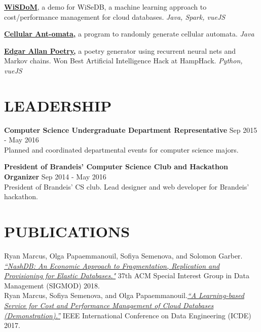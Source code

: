 \documentclass{res}
\begin{document}
\begin{resume}
\textbf{\href{https://www.youtube.com/watch?v=YAKRxSoUs18&feature=youtu.be}{WiSDoM}}, a demo for WiSeDB, a machine learning approach to cost/performance management for cloud  databases. {\sl Java, Spark, vueJS}
	
\textbf{\href{https://sofiya.io/blog/turmite-art}{Cellular Ant-omata,}} a program to randomly generate cellular automata. {\sl Java}
	
\textbf{\href{https://sofiya.io/projects/edgar-allan-poetry.html}{Edgar Allan Poetry,}} a poetry generator using recurrent neural nets and Markov chains. Won Best  Artificial Intelligence Hack at HampHack. {\sl Python, vueJS}

\section{LEADERSHIP}  

\textbf{Computer Science Undergraduate Department Representative} \hfill Sep 2015 - May 2016 \\
	Planned and coordinated departmental events for computer science majors.	

\textbf{President of Brandeis' Computer Science Club and Hackathon Organizer} \hfill Sep 2014 - May 2016 \\
	President of Brandeis' CS club. Lead designer and web developer for Brandeis' hackathon.
	
\section{PUBLICATIONS}             
	 Ryan Marcus, Olga Papaemmanouil, Sofiya Semenova, and Solomon Garber. \href{https://api.zotero.org/users/3604318/publications/items/35KTECTC/file/view}{\sl “NashDB: An Economic Approach to Fragmentation, Replication and Provisioning for Elastic Databases."} 37th ACM Special Interest Group in Data Management (SIGMOD) 2018. \\
	  Ryan Marcus, Sofiya Semenova, and Olga Papaemmanouil.\href{http://www.cs.brandeis.edu/~olga/publications/icde17-demo.pdf}{\sl “A Learning-based Service for Cost and Performance Management of Cloud Databases (Demonstration).”} IEEE International Conference on Data Engineering (ICDE) 2017.


\end{resume}
\end{document}
